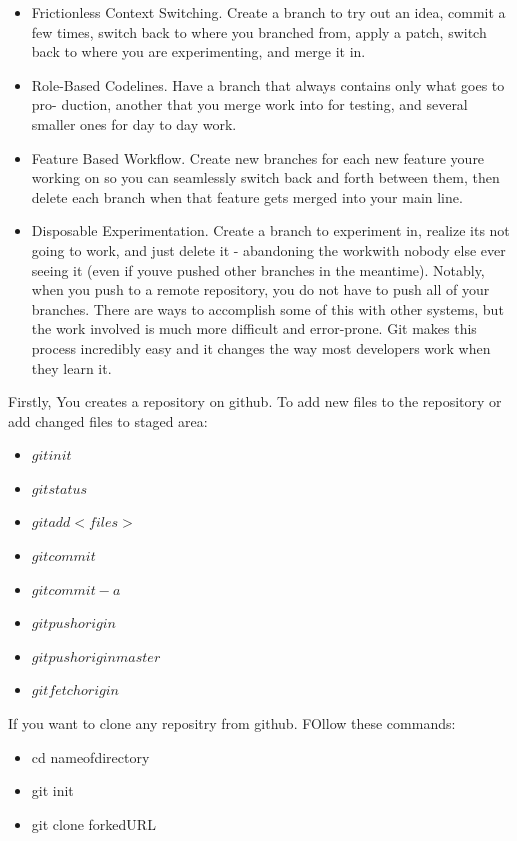 \begin{itemize}
\item Frictionless Context Switching. Create a branch to try out an idea, commit a few
times, switch back to where you branched from, apply a patch, switch back to where
you are experimenting, and merge it in.
\item Role-Based Codelines. Have a branch that always contains only what goes to pro-
duction, another that you merge work into for testing, and several smaller ones for
day to day work.
\item Feature Based Workflow. Create new branches for each new feature youre working
on so you can seamlessly switch back and forth between them, then delete each
branch when that feature gets merged into your main line.
\item Disposable Experimentation. Create a branch to experiment in, realize its not going
to work, and just delete it - abandoning the workwith nobody else ever seeing it
(even if youve pushed other branches in the meantime). Notably, when you push to
a remote repository, you do not have to push all of your branches. There are ways
to accomplish some of this with other systems, but the work involved is much more
difficult and error-prone. Git makes this process incredibly easy and it changes the
way most developers work when they learn it.
\end{itemize}

Firstly, You creates a repository on github. To add new files to the repository or add changed files to staged area:\\
\begin{itemize}
\item $ git init$
\item $ git status$
\item $ git add <files>$
\item $ git commit$
\item $ git commit -a$
\item $ git push origin$
\item $ git push origin master$
\item $ git fetch origin$
\end{itemize}

If you want to clone any repositry from github. FOllow these commands:
\begin{itemize}
\item cd nameofdirectory
\item git init
\item git clone forkedURL
\end{itemize}

